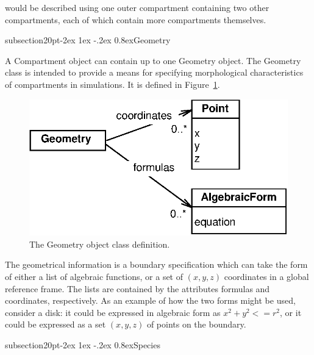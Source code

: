 \documentclass[10pt]{article}
\makeatletter
\renewcommand{\subsection}{\@startsection%
  {subsection}{2}{0pt}{-2ex \@plus 1ex \@minus -.2ex}%
  {0.8ex}{\slshape\large\bfseries}}
\newcommand{\class}[1]{\textsf{#1}}
\newcommand{\attrib}[1]{\textsf{#1}}
\makeatother
\begin{document}
would be described using one outer compartment containing two other
compartments, each of which contain more compartments themselves.


\subsection{Geometry}

A \class{Compartment} object can contain up to one \class{Geometry} object.
The \class{Geometry} class is intended to provide a means for specifying
morphological characteristics of compartments in simulations.  It is
defined in Figure~\ref{fig:geometry}.

\begin{figure}[hb]
  \centering
  \includegraphics[scale = 0.75]{geometry.eps}
  \caption{The \class{Geometry} object class definition.}
  \label{fig:geometry}
\end{figure}

The geometrical information is a boundary specification which can take the
form of either a list of algebraic functions, or a set of $(x,y,z)$
coordinates in a global reference frame.  The lists are contained by the
attributes \attrib{formulas} and \attrib{coordinates}, respectively.  As an
example of how the two forms might be used, consider a disk: it could be
expressed in algebraic form as $x^2 + y^2 <= r^2$, or it could be expressed
as a set ${(x,y,z)}$ of points on the boundary.


\subsection{Species}
\end{document}
